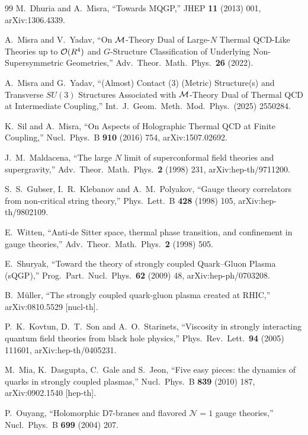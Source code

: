 \documentclass[a4paper,11pt,fleqn]{article}
\theoremstyle{plain}
\theoremstyle{definition}
\begin{document}
\begin{thebibliography}{99}
M.~Dhuria and A.~Misra,
``Towards MQGP,''
JHEP {\bf 11} (2013) 001,
arXiv:1306.4339.

A.~Misra and V.~Yadav,
``On ${\cal M}$-Theory Dual of Large-$N$ Thermal QCD-Like Theories up to ${\cal O}(R^4)$ and $G$-Structure Classification of Underlying Non-Supersymmetric Geometries,''
Adv.\ Theor.\ Math.\ Phys.\ {\bf 26} (2022).

A.~Misra and G.~Yadav,
``(Almost) Contact (3) (Metric) Structure(s) and Transverse $SU(3)$ Structures Associated with ${\cal M}$-Theory Dual of Thermal QCD at Intermediate Coupling,''
Int.\ J.\ Geom.\ Meth.\ Mod.\ Phys.\ (2025) 2550284.

K.~Sil and A.~Misra,
``On Aspects of Holographic Thermal QCD at Finite Coupling,''
Nucl.\ Phys.\ B {\bf 910} (2016) 754,
arXiv:1507.02692.

J.~M.~Maldacena,
``The large $N$ limit of superconformal field theories and supergravity,''
Adv.\ Theor.\ Math.\ Phys.\ {\bf 2} (1998) 231,
arXiv:hep-th/9711200.

S.~S.~Gubser, I.~R.~Klebanov and A.~M.~Polyakov,
``Gauge theory correlators from non-critical string theory,''
Phys.\ Lett.\ B {\bf 428} (1998) 105,
arXiv:hep-th/9802109.

E.~Witten,
``Anti-de Sitter space, thermal phase transition, and confinement in gauge theories,''
Adv.\ Theor.\ Math.\ Phys.\ {\bf 2} (1998) 505.

E.~Shuryak,
``Toward the theory of strongly coupled Quark--Gluon Plasma (sQGP),''
Prog.\ Part.\ Nucl.\ Phys.\ {\bf 62} (2009) 48,
arXiv:hep-ph/0703208.

B.~M\"{u}ller,
``The strongly coupled quark-gluon plasma created at RHIC,''
arXiv:0810.5529 [nucl-th].

P.~K.~Kovtun, D.~T.~Son and A.~O.~Starinets,
``Viscosity in strongly interacting quantum field theories from black hole physics,''
Phys.\ Rev.\ Lett.\ {\bf 94} (2005) 111601,
arXiv:hep-th/0405231.

M.~Mia, K.~Dasgupta, C.~Gale and S.~Jeon,
``Five easy pieces: the dynamics of quarks in strongly coupled plasmas,''
Nucl.\ Phys.\ B {\bf 839} (2010) 187,
arXiv:0902.1540 [hep-th].

P.~Ouyang,
``Holomorphic D7-branes and flavored $\mathcal{N}=1$ gauge theories,''
Nucl.\ Phys.\ B {\bf 699} (2004) 207.


\end{thebibliography}
\end{document}
